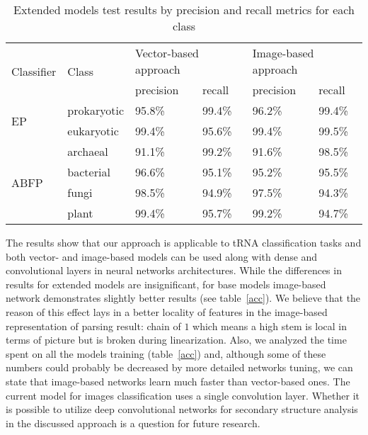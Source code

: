 \begin{table}[h]
\centering
\caption{Extended models test results by precision and recall metrics for each class}
\begin{tabular}{|l||l|l|l|l|l|}
\hline
\multirow{2}{*}{Classifier} & \multirow{2}{*}{Class} & \multicolumn{2}{l|}{Vector-based approach} & \multicolumn{2}{l|}{Image-based approach} \\ \cline{3-6} 
                            &                        & precision         & recall        & precision        & recall        \\ \hline \hline
\multirow{2}{*}{EP}         & prokaryotic            & 95.8\%            & 99.4\%        & 96.2\%           & 99.4\%        \\ \cline{2-6} 
                            & eukaryotic             & 99.4\%            & 95.6\%        & 99.4\%           & 99.5\%        \\ \hline \hline
\multirow{4}{*}{ABFP}       & archaeal               & 91.1\%            & 99.2\%        & 91.6\%           & 98.5\%        \\ \cline{2-6} 
                            & bacterial              & 96.6\%            & 95.1\%        & 95.2\%           & 95.5\%        \\ \cline{2-6} 
                            & fungi                  & 98.5\%            & 94.9\%        & 97.5\%           & 94.3\%        \\ \cline{2-6} 
                            & plant                  & 99.4\%            & 95.7\%        & 99.2\%           & 94.7\%        \\ \hline
\end{tabular}
\label{pe}
\end{table}

The results show that our approach is applicable to tRNA classification tasks and both vector- and image-based models can be used along with dense and convolutional layers in neural networks architectures.
While the differences in results for extended models are insignificant, for base models image-based network demonstrates slightly better results (see table~\ref{acc}).
We believe that the reason of this effect lays in a better locality of features in the image-based representation of parsing result: chain of $1$ which means a high stem is local in terms of picture but is broken during linearization. 
Also, we analyzed the time spent on all the models training (table~\ref{acc}) and, although some of these numbers could probably be decreased by more detailed networks tuning, we can state that image-based networks learn much faster than vector-based ones.
The current model for images classification uses a single convolution layer.
Whether it is possible to utilize deep convolutional networks for secondary structure analysis in the discussed approach is a question for future research.

